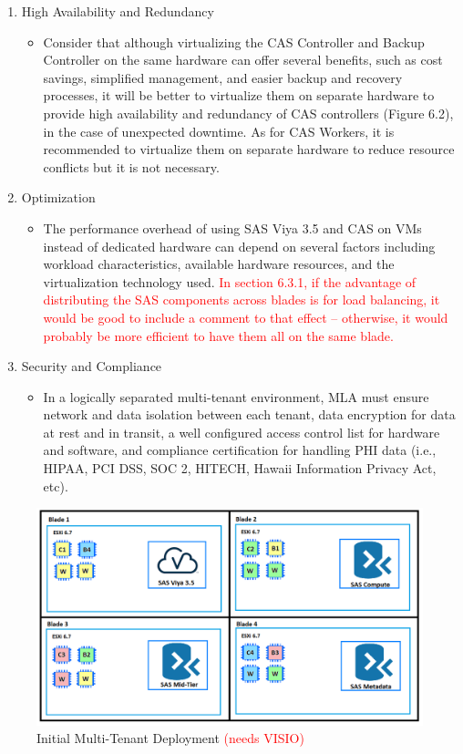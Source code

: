 \begin{enumerate}
    \item High Availability and Redundancy
    \begin{itemize}
        \item Consider that although virtualizing the CAS Controller and Backup Controller on the same hardware can offer several benefits, such as cost savings, simplified management, and easier backup and recovery processes, it will be better to virtualize them on separate hardware to provide high availability and redundancy of CAS controllers (Figure 6.2), in the case of unexpected downtime. As for CAS Workers, it is recommended to virtualize them on separate hardware to reduce resource conflicts but it is not necessary. 
    \end{itemize}
    \item Optimization
    \begin{itemize}
        \item The performance overhead of using SAS Viya 3.5 and CAS on VMs instead of dedicated hardware can depend on several factors including workload characteristics, available hardware resources, and the virtualization technology used.
        \textcolor{red}{In section 6.3.1, if the advantage of distributing the SAS components across blades is for load balancing, it would be good to include a comment to that effect -- otherwise, it would probably be more efficient to have them all on the same blade.}
    \end{itemize}
    \item Security and Compliance
    \begin{itemize}
        \item In a logically separated multi-tenant environment, MLA must ensure network and data isolation between each tenant, data encryption for data at rest and in transit, a well configured access control list for hardware and software, and compliance certification for handling PHI data (i.e., HIPAA, PCI DSS, SOC 2, HITECH, Hawaii Information Privacy Act, etc). 

    \end{itemize}
\end{enumerate}
\begin{figure}[H]
    \centering
    \includegraphics[scale = 0.52]{images/initial-deployment-diagram.png}
    \caption{Initial Multi-Tenant Deployment \textcolor{red}{(needs VISIO)} }
    \label{Initial Multi-Tenant Deployment}
\end{figure} 

